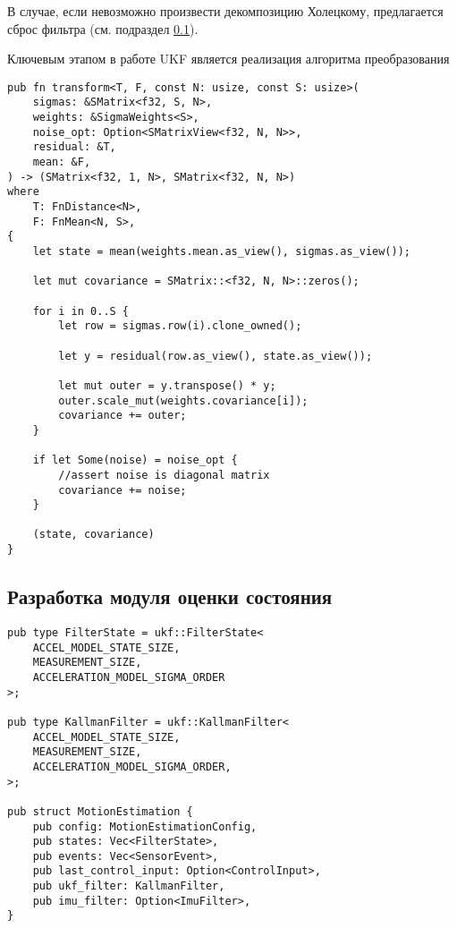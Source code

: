 В случае, если невозможно произвести декомпозицию Холецкому,
предлагается сброс фильтра (см. подраздел \ref{subsec:motion_estimation}).

Ключевым этапом в работе UKF является реализация алгоритма преобразования  

\begin{lstlisting}
pub fn transform<T, F, const N: usize, const S: usize>(
    sigmas: &SMatrix<f32, S, N>,
    weights: &SigmaWeights<S>,
    noise_opt: Option<SMatrixView<f32, N, N>>,
    residual: &T,
    mean: &F,
) -> (SMatrix<f32, 1, N>, SMatrix<f32, N, N>)
where
    T: FnDistance<N>,
    F: FnMean<N, S>,
{
    let state = mean(weights.mean.as_view(), sigmas.as_view());

    let mut covariance = SMatrix::<f32, N, N>::zeros();

    for i in 0..S {
        let row = sigmas.row(i).clone_owned();

        let y = residual(row.as_view(), state.as_view());

        let mut outer = y.transpose() * y;
        outer.scale_mut(weights.covariance[i]);
        covariance += outer;
    }

    if let Some(noise) = noise_opt {
        //assert noise is diagonal matrix
        covariance += noise;
    }

    (state, covariance)
}
\end{lstlisting}





\subsection{Разработка модуля оценки состояния}
\label{subsec:motion_estimation}

\begin{lstlisting}
pub type FilterState = ukf::FilterState<
    ACCEL_MODEL_STATE_SIZE,
    MEASUREMENT_SIZE,
    ACCELERATION_MODEL_SIGMA_ORDER
>;

pub type KallmanFilter = ukf::KallmanFilter<
    ACCEL_MODEL_STATE_SIZE,
    MEASUREMENT_SIZE,
    ACCELERATION_MODEL_SIGMA_ORDER,
>;

pub struct MotionEstimation {
    pub config: MotionEstimationConfig,
    pub states: Vec<FilterState>,
    pub events: Vec<SensorEvent>,
    pub last_control_input: Option<ControlInput>,
    pub ukf_filter: KallmanFilter,
    pub imu_filter: Option<ImuFilter>,
}
\end{lstlisting}

